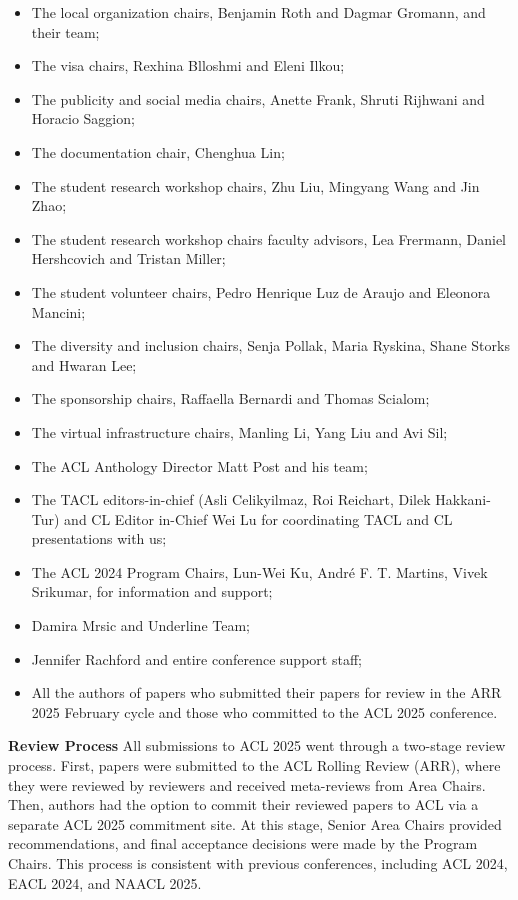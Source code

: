 \begin{itemize}
\item The local organization chairs, Benjamin Roth and Dagmar Gromann, and their team;
\item The visa chairs, Rexhina Blloshmi and Eleni Ilkou;
\item The publicity and social media chairs, Anette Frank, Shruti Rijhwani and Horacio Saggion;
\item The documentation chair, Chenghua Lin;
\item The student research workshop chairs, Zhu Liu, Mingyang Wang and Jin Zhao;
\item The student research workshop chairs faculty advisors, Lea Frermann, Daniel Hershcovich               
and Tristan Miller;
\item The student volunteer chairs, Pedro Henrique Luz de Araujo and Eleonora Mancini;
\item The diversity and inclusion chairs, Senja Pollak, Maria Ryskina, Shane Storks and Hwaran Lee;
\item The sponsorship chairs, Raffaella Bernardi and Thomas Scialom;
\item The virtual infrastructure chairs, Manling Li, Yang Liu and Avi Sil;
\item The ACL Anthology Director Matt Post and his team;
\item The TACL editors-in-chief (Asli Celikyilmaz, Roi Reichart, Dilek Hakkani-Tur) and CL Editor in-Chief Wei Lu for coordinating TACL and CL presentations with us;
\item The ACL 2024 Program Chairs, Lun-Wei Ku, André F. T. Martins, Vivek Srikumar, for information and support;
\item Damira Mrsic and Underline Team; 
\item Jennifer Rachford and entire conference support staff; 
\item All the authors of papers who submitted their papers for review in the ARR 2025 February cycle and those who committed to the ACL 2025 conference.
\end{itemize}

\textbf{Review Process}
All submissions to ACL 2025 went through a two-stage review process. First, papers were submitted to the ACL Rolling Review (ARR), where they were reviewed by reviewers and received meta-reviews from Area Chairs. Then, authors had the option to commit their reviewed papers to ACL via a separate ACL 2025 commitment site. At this stage, Senior Area Chairs provided recommendations, and final acceptance decisions were made by the Program Chairs. This process is consistent with previous conferences, including ACL 2024, EACL 2024, and NAACL 2025.

